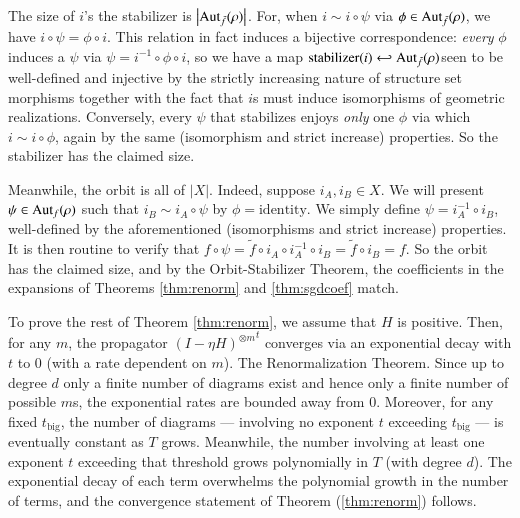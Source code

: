 \documentclass{article}
\newcommand{\Aut}{\text{\textnormal{Aut}}}
\newcommand{\wabs}[1]{\left|#1\right|}
\begin{document}
            The size of $i$'s the stabilizer is $\wabs{\Aut_{\tilde f}(\rho)}$.
            For, when $i \sim i \circ \psi$ via $\phi \in \Aut_{\tilde
            f}(\rho)$, we have $i\circ \psi = \phi \circ i$.  This relation in
            fact induces a bijective correspondence: \emph{every} $\phi$
            induces a $\psi$ via $\psi = i^{-1} \circ \phi \circ i$, so we have
            a map $\text{stabilizer}(i) \hookleftarrow \Aut_{\tilde f}(\rho)
            $seen to be well-defined and injective by the strictly increasing
            nature of structure set morphisms together with the fact that $i$s
            must induce isomorphisms of geometric realizations.  Conversely,
            every $\psi$ that stabilizes enjoys \emph{only} one $\phi$ via
            which $i \sim i \circ \phi$, again by the same (isomorphism and
            strict increase) properties.  So the stabilizer has the claimed
            size.

            Meanwhile, the orbit is all of $\wabs{X}$.  Indeed, suppose
            $i_A, i_B \in X$.  We will present $\psi \in \Aut_f(\rho)$ such
            that $i_B \sim i_A \circ \psi$ by $\phi=\text{identity}$.  We
            simply define $\psi = i_A^{-1} \circ i_B$, well-defined by the
            aforementioned (isomorphisms and strict increase) properties.
            It is then routine to verify that
            $
                f \circ \psi
                =
                \tilde f \circ i_A \circ i_A^{-1} \circ i_B
                =
                \tilde f \circ i_B
                = f.
            $
            So the orbit has the claimed size, and by the Orbit-Stabilizer
            Theorem, the coefficients in the expansions of Theorems 
            \ref{thm:renorm} and \ref{thm:sgdcoef} match.

            To prove the rest of Theorem \ref{thm:renorm}, we assume that $H$
            is positive.  Then, for any $m$, the propagator ${(I-\eta
            H)^{\otimes m}}^t$ converges via an exponential decay with $t$ to
            $0$ (with a rate dependent on $m$).  The Renormalization Theorem.
            Since up to degree $d$ only a finite number of diagrams exist and
            hence only a finite number of possible $m$s, the exponential rates
            are bounded away from $0$.  Moreover, for any fixed
            $t_{\text{big}}$, the number of diagrams --- involving no exponent
            $t$ exceeding  $t_{\text{big}}$ --- is eventually constant as $T$
            grows.  Meanwhile, the number involving at least one exponent $t$
            exceeding that threshold grows polynomially in $T$ (with degree
            $d$).  The exponential decay of each term overwhelms the polynomial
            growth in the number of terms, and the convergence statement of
            Theorem (\ref{thm:renorm}) follows.
\end{document}
